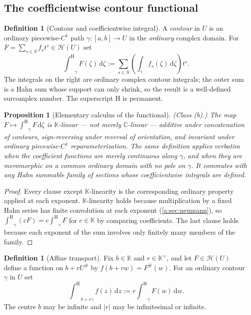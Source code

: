 \documentclass[11pt,a4paper]{article}
\numberwithin{equation}{section}
\newtheorem{proposition}[theorem]{Proposition}
\theoremstyle{definition}
\newtheorem{definition}[theorem]{Definition}
\theoremstyle{remark}
\theoremstyle{plain}
\newcommand{\K}{\mathbb K}
\newcommand{\CC}{\mathbb C}
\newcommand{\tm}{t}
\newcommand{\halo}[1]{#1^{\#}}
\newcommand{\ev}[1]{#1^{\#}}
\newcommand{\Hc}{\mathcal H}
\newcommand{\intH}{{\int^{\mathrm H}}}
\newcommand{\abs}[1]{\lvert #1\rvert}
\newcommand{\dd}{\mathrm d}
\begin{document}
\subsection{The coefficientwise contour functional}
\label{c:p5:defsec}

\begin{definition}[Contour and coefficientwise integral]
\label{c:p5:def-integral}
A \emph{contour} in $U$ is an ordinary piecewise-$C^{1}$ path
$\gamma:[a,b]\to U$ in the \emph{ordinary} complex domain. For
$F=\sum_{s\in S}f_s\tm^{s}\in\Hc(U)$ set
\begin{equation}\label{c:p5:eq-integral}
 \intH_{\gamma}F(\zeta)\,\dd\zeta
 :=\sum_{s\in S}\left(\int_{\gamma}f_s(\zeta)\,\dd\zeta\right)\tm^{s}.
\end{equation}
The integrals on the right are ordinary complex contour integrals; the
outer sum is a Hahn sum whose support can only shrink, so the result is
a well-defined surcomplex number. The superscript $\mathrm H$ is
permanent.
\end{definition}

\begin{proposition}[Elementary calculus of the functional]
\label{c:p5:calculus}
\emph{(Class (b).)} The map $F\mapsto\intH_{\gamma}F\,\dd\zeta$ is
$\K$-linear --- not merely $\CC$-linear --- additive under concatenation
of contours, sign-reversing under reversal of orientation, and invariant
under ordinary piecewise-$C^{1}$ reparameterization. The same definition
applies verbatim when the coefficient functions are merely continuous
along $\gamma$, and when they are meromorphic on a common ordinary
domain with no pole on $\gamma$. It commutes with any Hahn summable
family of sections whose coefficientwise integrals are defined.
\end{proposition}

\begin{proof}
Every clause except $\K$-linearity is the corresponding ordinary
property applied at each exponent. $\K$-linearity holds because
multiplication by a fixed Hahn series has finite convolution at each
exponent (\ref{a:sec:neumann}), so
$\intH_\gamma(cF)=c\intH_\gamma F$ for $c\in\K$ by comparing
coefficients. The last clause holds because each exponent of the sum
involves only finitely many members of the family.
\end{proof}

\begin{definition}[Affine transport]\label{c:p5:affine}
Fix $b\in\K$ and $r\in\K^{\times}$, and let $F\in\Hc(U)$ define a
function on $b+r\halo U$ by $f(b+rw)=\ev F(w)$. For an ordinary contour
$\gamma$ in $U$ set
\begin{equation}\label{c:p5:eq-affine}
 \intH_{\,b+r\gamma}f(z)\,\dd z:=r\intH_{\gamma}F(w)\,\dd w.
\end{equation}
The centre $b$ may be infinite and $\abs r$ may be infinitesimal or
infinite.
\end{definition}
\end{document}
